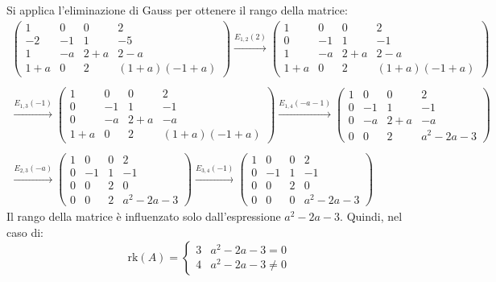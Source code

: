 \documentclass[a4paper]{article}
\begin{document}
	\noindent
	Si applica l'eliminazione di Gauss per ottenere il rango della matrice:
	\begin{gather*}
		\begin{pmatrix}
			1	& 0		& 0		& 2 \\
			-2	& -1	& 1		& -5 \\
			1	& -a	& 2+a	& 2-a \\
			1+a	& 0		& 2		& \left(1+a\right)\left(-1+a\right)
		\end{pmatrix}
		\xrightarrow{E_{1,2}\left(2\right)}
		\begin{pmatrix}
			1	& 0		& 0		& 2 \\
			0	& -1	& 1		& -1 \\
			1	& -a	& 2+a	& 2-a \\
			1+a	& 0		& 2		& \left(1+a\right)\left(-1+a\right)
		\end{pmatrix} \\
		\\
		\xrightarrow{E_{1,3}\left(-1\right)}
		\begin{pmatrix}
			1	& 0		& 0		& 2 \\
			0	& -1	& 1		& -1 \\
			0	& -a	& 2+a	& -a \\
			1+a	& 0		& 2		& \left(1+a\right)\left(-1+a\right)
		\end{pmatrix}
		\xrightarrow{E_{1,4}\left(-a-1\right)}
		\begin{pmatrix}
			1	& 0		& 0		& 2 \\
			0	& -1	& 1		& -1 \\
			0	& -a	& 2+a	& -a \\
			0	& 0		& 2		& a^{2} -2a -3
		\end{pmatrix} \\
		\\
		\xrightarrow{E_{2,3}\left(-a\right)}
		\begin{pmatrix}
			1	& 0		& 0		& 2 \\
			0	& -1	& 1		& -1 \\
			0	& 0		& 2		& 0 \\
			0	& 0		& 2		& a^{2} -2a -3
		\end{pmatrix}
		\xrightarrow{E_{3,4}\left(-1\right)}
		\begin{pmatrix}
			1	& 0		& 0		& 2 \\
			0	& -1	& 1		& -1 \\
			0	& 0		& 2		& 0 \\
			0	& 0		& 0		& a^{2} -2a -3
		\end{pmatrix}
	\end{gather*}
	Il rango della matrice è influenzato solo dall'espressione $a^{2} - 2a - 3$. Quindi, nel caso di:
	\begin{equation*}
		\mathrm{rk}\left(A\right) =
		\begin{cases}
			3	& a^{2} - 2a -3 = 0\\
			4	& a^{2} - 2a -3 \ne 0
		\end{cases}
	\end{equation*}\newpage
	
\end{document}
